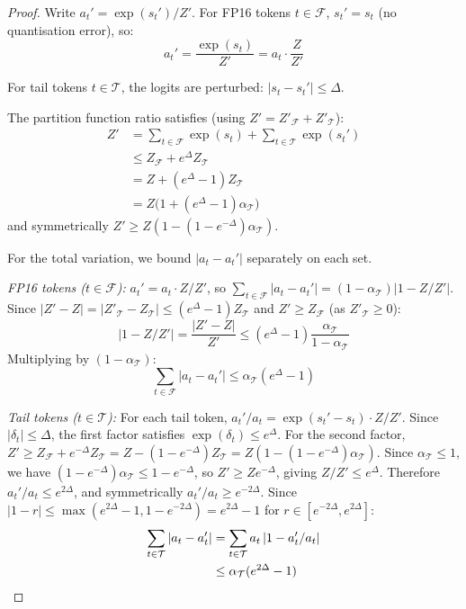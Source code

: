 \documentclass[10pt,twocolumn,a4paper]{article}
\theoremstyle{definition}
\theoremstyle{remark}
\begin{document}
\begin{proof}
Write $a_t' = \exp(s_t')/Z'$.  For FP16 tokens $t \in \mathcal{F}$, $s_t' = s_t$ (no quantisation error), so:
\[
  a_t' = \frac{\exp(s_t)}{Z'} = a_t \cdot \frac{Z}{Z'}
\]

For tail tokens $t \in \mathcal{T}$, the logits are perturbed: $|s_t - s_t'| \leq \Delta$.

The partition function ratio satisfies (using $Z' = Z'_{\mathcal{F}} + Z'_{\mathcal{T}}$):
\begin{align*}
  Z' &= \sum_{t \in \mathcal{F}} \exp(s_t) + \sum_{t \in \mathcal{T}} \exp(s_t') \\
     &\leq Z_{\mathcal{F}} + e^{\Delta} Z_{\mathcal{T}} \\
     &= Z + (e^{\Delta} - 1) Z_{\mathcal{T}} \\
     &= Z\bigl(1 + (e^{\Delta} - 1)\alpha_{\mathcal{T}}\bigr)
\end{align*}
and symmetrically $Z' \geq Z(1 - (1 - e^{-\Delta})\alpha_{\mathcal{T}})$.

For the total variation, we bound $|a_t - a_t'|$ separately on each set.

\emph{FP16 tokens ($t \in \mathcal{F}$):}  $a_t' = a_t \cdot Z/Z'$, so
$\sum_{t \in \mathcal{F}} |a_t - a_t'| = (1 - \alpha_{\mathcal{T}}) |1 - Z/Z'|$.
Since $|Z' - Z| = |Z'_{\mathcal{T}} - Z_{\mathcal{T}}| \leq (e^{\Delta} - 1)Z_{\mathcal{T}}$
and $Z' \geq Z_{\mathcal{F}}$ (as $Z'_{\mathcal{T}} \geq 0$):
\[
  |1 - Z/Z'| = \frac{|Z' - Z|}{Z'}
  \leq (e^{\Delta} - 1)\frac{\alpha_{\mathcal{T}}}{1 - \alpha_{\mathcal{T}}}
\]
Multiplying by $(1 - \alpha_{\mathcal{T}})$:
\begin{equation}\label{eq:fp16_contrib}
  \sum_{t \in \mathcal{F}} |a_t - a_t'| \leq \alpha_{\mathcal{T}} (e^{\Delta} - 1)
\end{equation}

\emph{Tail tokens ($t \in \mathcal{T}$):}  For each tail token, $a_t'/a_t = \exp(s_t' - s_t) \cdot Z/Z'$.
Since $|\delta_t| \leq \Delta$, the first factor satisfies $\exp(\delta_t) \leq e^{\Delta}$.
For the second factor, $Z' \geq Z_{\mathcal{F}} + e^{-\Delta}Z_{\mathcal{T}} = Z - (1 - e^{-\Delta})Z_{\mathcal{T}} = Z(1 - (1 - e^{-\Delta})\alpha_{\mathcal{T}})$.
Since $\alpha_{\mathcal{T}} \leq 1$, we have $(1 - e^{-\Delta})\alpha_{\mathcal{T}} \leq 1 - e^{-\Delta}$, so $Z' \geq Z e^{-\Delta}$, giving $Z/Z' \leq e^{\Delta}$.
Therefore $a_t'/a_t \leq e^{2\Delta}$, and symmetrically $a_t'/a_t \geq e^{-2\Delta}$.
Since $|1 - r| \leq \max(e^{2\Delta} - 1, 1 - e^{-2\Delta}) = e^{2\Delta} - 1$ for $r \in [e^{-2\Delta}, e^{2\Delta}]$:
\begin{align}\label{eq:tail_contrib}
  \sum_{t \in \mathcal{T}} |a_t - a_t'|
  &= \sum_{t \in \mathcal{T}} a_t \,|1 - a_t'/a_t| \notag \\
  &\leq \alpha_{\mathcal{T}} (e^{2\Delta} - 1)
\end{align}


\end{proof}
\end{document}

